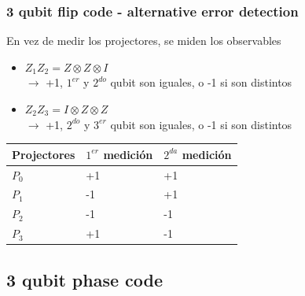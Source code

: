 \documentclass[10pt]{beamer}
\theoremstyle{remark}
\theoremstyle{definition}
\begin{document}
\begin{frame}[allowframebreaks]
    \frametitle{3 qubit flip code - alternative error detection}

    En vez de medir los projectores, se miden los observables
    \begin{itemize}
        \item $Z_1 Z_2 = Z \otimes Z \otimes I$ \\
        \hspace{0.7cm} $\rightarrow$ +1, $1^{er}$ y $2^{do}$ qubit son iguales, o -1 si son distintos
        \item $Z_2 Z_3 = I \otimes Z \otimes Z$ \\
        \hspace{0.7cm} $\rightarrow$ +1, $2^{do}$ y $3^{er}$ qubit son iguales, o -1 si son distintos
    \end{itemize}

    \begin{center}
        \begin{tabular}{ | l | l | l | }
            \hline
            Projectores & $1^{er}$ medición & $2^{da}$ medición \\ 
            \hline
            $P_0$ & +1 & +1 \\
            $P_1$ & -1 & +1 \\
            $P_2$ & -1 & -1 \\
            $P_3$ & +1 & -1 \\
            \hline
       \end{tabular}
    \end{center}

\end{frame}

\subsection{3 qubit phase code}
\end{document}
